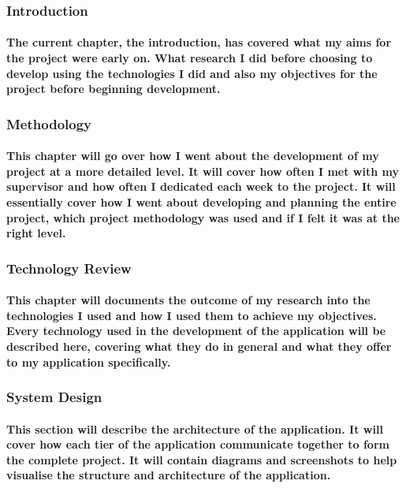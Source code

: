     \subsubsection{Introduction}
    \paragraph{The current chapter, the introduction, has covered what my aims for the project were early on. What research I did before choosing to develop using the technologies I did and also my objectives for the project before beginning development.}
    \subsubsection{Methodology}
    \paragraph{This chapter will go over how I went about the development of my project at a more detailed level. It will cover how often I met with my supervisor and how often I dedicated each week to the project. It will essentially cover how I went about developing and planning the entire project, which project methodology was used and if I felt it was at the right level. }
    \subsubsection{Technology Review}
    \paragraph{This chapter will documents the outcome of my research into the technologies I used and how I used them to achieve my objectives. Every technology used in the development of the application will be described here, covering what they do in general and what they offer to my application specifically.}
    \subsubsection{System Design}
    \paragraph{This section will describe the architecture of the application. It will cover how each tier of the application communicate together to form the complete project. It will contain diagrams and screenshots to help visualise the structure and architecture of the application.}
